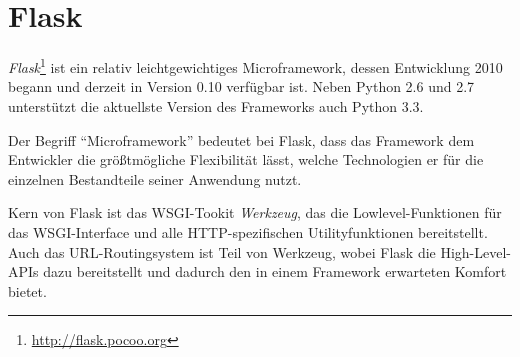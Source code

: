 \section{Flask}

\emph{Flask}\footnote{\href{http://flask.pocoo.org}{http://flask.pocoo.org}} ist ein relativ
leichtgewichtiges Microframework, dessen Entwicklung 2010 begann und derzeit in Version 0.10
verfügbar ist. Neben Python 2.6 und 2.7 unterstützt die aktuellste Version des Frameworks auch
Python 3.3.

Der Begriff \enquote{Microframework} bedeutet bei Flask, dass das Framework dem Entwickler die
größtmögliche Flexibilität lässt, welche Technologien er für die einzelnen Bestandteile seiner
Anwendung nutzt.

Kern von Flask ist das WSGI-Tookit \emph{Werkzeug}, das die Lowlevel-Funktionen für das
WSGI-Interface und alle HTTP-spezifischen Utilityfunktionen bereitstellt. Auch das URL-Routingsystem
ist Teil von Werkzeug, wobei Flask die High-Level-APIs dazu bereitstellt und dadurch den in einem
Framework erwarteten Komfort bietet.


